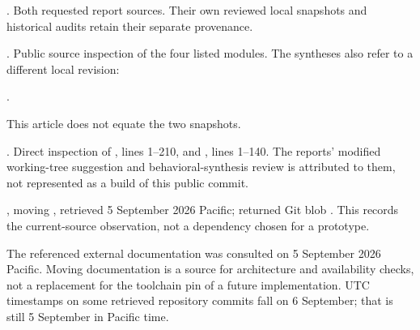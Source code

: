 \documentclass[11pt,a4paper]{article}
\newcommand{\code}[1]{\texttt{\detokenize{#1}}}
\theoremstyle{remark}\newtheorem{example}[proposition]{Example}
\begin{document}
\begin{description}[style=nextline]
\item[Brainstorm]
. Both requested report sources. Their own reviewed local snapshots and historical audits retain their separate provenance.
\item[ProveIt]
. Public source inspection of the four listed modules. The syntheses also refer to a different local revision:\par
{}.\par
This article does not equate the two snapshots.
\item[Leant]
. Direct inspection of , lines 1--210, and , lines 1--140. The reports' modified working-tree suggestion and behavioral-synthesis review is attributed to them, not represented as a build of this public commit.
\item[Mathlib availability check]
, moving \code{master}, retrieved 5 September 2026 Pacific; returned Git blob . This records the current-source observation, not a dependency chosen for a prototype.
\end{description}
The referenced external documentation was consulted on 5 September 2026 Pacific. Moving documentation is a source for architecture and availability checks, not a replacement for the toolchain pin of a future implementation. UTC timestamps on some retrieved repository commits fall on 6 September; that is still 5 September in Pacific time.
\end{document}
